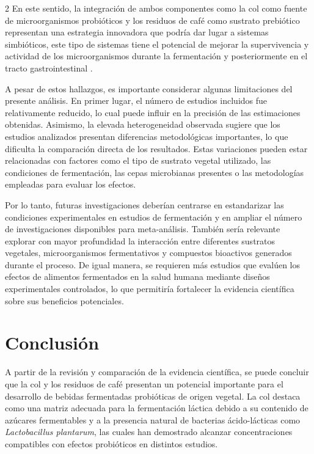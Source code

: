 \begin{multicols}{2}
En este sentido, la integración de ambos componentes como la col como fuente de microorganismos probióticos y los residuos de café como sustrato prebiótico representan una estrategia innovadora que podría dar lugar a sistemas simbióticos, este tipo de sistemas tiene el potencial de mejorar la supervivencia y actividad de los microorganismos durante la fermentación y posteriormente en el tracto gastrointestinal \citep{suez2019}.

A pesar de estos hallazgos, es importante considerar algunas limitaciones del presente análisis. En primer lugar, el número de estudios incluidos fue relativamente reducido, lo cual puede influir en la precisión de las estimaciones obtenidas. Asimismo, la elevada heterogeneidad observada sugiere que los estudios analizados presentan diferencias metodológicas importantes, lo que dificulta la comparación directa de los resultados. Estas variaciones pueden estar relacionadas con factores como el tipo de sustrato vegetal utilizado, las condiciones de fermentación, las cepas microbianas presentes o las metodologías empleadas para evaluar los efectos.

Por lo tanto, futuras investigaciones deberían centrarse en estandarizar las condiciones experimentales en estudios de fermentación y en ampliar el número de investigaciones disponibles para meta-análisis. También sería relevante explorar con mayor profundidad la interacción entre diferentes sustratos vegetales, microorganismos fermentativos y compuestos bioactivos generados durante el proceso. De igual manera, se requieren más estudios que evalúen los efectos de alimentos fermentados en la salud humana mediante diseños experimentales controlados, lo que permitiría fortalecer la evidencia científica sobre sus beneficios potenciales. 

\section{Conclusión}

A partir de la revisión y comparación de la evidencia científica, se puede concluir que la col y los residuos de café presentan un potencial importante para el desarrollo de bebidas fermentadas probióticas de origen vegetal. La col destaca como una matriz adecuada para la fermentación láctica debido a su contenido de azúcares fermentables y a la presencia natural de bacterias ácido-lácticas como \textit{Lactobacillus plantarum}, las cuales han demostrado alcanzar concentraciones compatibles con efectos probióticos en distintos estudios.


\end{multicols}

